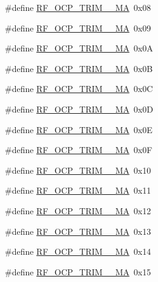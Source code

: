 \begin{DoxyCompactItemize}
\item 
\#define \hyperlink{sx1276Regs-Fsk_8h_a457a3f7221afb38da84a69a8745e53b6}{R\+F\+\_\+\+O\+C\+P\+\_\+\+T\+R\+I\+M\+\_\+\_\+\+MA}~0x08
\item 
\#define \hyperlink{sx1276Regs-Fsk_8h_aae9790e06b8eb78619b36ddac797362d}{R\+F\+\_\+\+O\+C\+P\+\_\+\+T\+R\+I\+M\+\_\+\_\+\+MA}~0x09
\item 
\#define \hyperlink{sx1276Regs-Fsk_8h_a26174898b5ac7efce60f4b347910b1ca}{R\+F\+\_\+\+O\+C\+P\+\_\+\+T\+R\+I\+M\+\_\+\_\+\+MA}~0x0A
\item 
\#define \hyperlink{sx1276Regs-Fsk_8h_a1387ca1b80a4984a2de36325743a6050}{R\+F\+\_\+\+O\+C\+P\+\_\+\+T\+R\+I\+M\+\_\+\_\+\+MA}~0x0B
\item 
\#define \hyperlink{sx1276Regs-Fsk_8h_a87c78055bb1ff7e9f72416324d1afa5f}{R\+F\+\_\+\+O\+C\+P\+\_\+\+T\+R\+I\+M\+\_\+\_\+\+MA}~0x0C
\item 
\#define \hyperlink{sx1276Regs-Fsk_8h_aec4e8936c74d0338b33f7c5201a13007}{R\+F\+\_\+\+O\+C\+P\+\_\+\+T\+R\+I\+M\+\_\+\_\+\+MA}~0x0D
\item 
\#define \hyperlink{sx1276Regs-Fsk_8h_ac48e4dd5062ac350432eadd140ba12fe}{R\+F\+\_\+\+O\+C\+P\+\_\+\+T\+R\+I\+M\+\_\+\_\+\+MA}~0x0E
\item 
\#define \hyperlink{sx1276Regs-Fsk_8h_abc2ff6a69d2a51ea5b724ca790af57bc}{R\+F\+\_\+\+O\+C\+P\+\_\+\+T\+R\+I\+M\+\_\+\_\+\+MA}~0x0F
\item 
\#define \hyperlink{sx1276Regs-Fsk_8h_a86b4c20cd2573e3fa003699d26e9dec5}{R\+F\+\_\+\+O\+C\+P\+\_\+\+T\+R\+I\+M\+\_\+\_\+\+MA}~0x10
\item 
\#define \hyperlink{sx1276Regs-Fsk_8h_ac7e461bc044a8ce5c11b3c944da839a0}{R\+F\+\_\+\+O\+C\+P\+\_\+\+T\+R\+I\+M\+\_\+\_\+\+MA}~0x11
\item 
\#define \hyperlink{sx1276Regs-Fsk_8h_a353421d2bcb86f0e10738e847ee7cc33}{R\+F\+\_\+\+O\+C\+P\+\_\+\+T\+R\+I\+M\+\_\+\_\+\+MA}~0x12
\item 
\#define \hyperlink{sx1276Regs-Fsk_8h_aff8239a2ad3878879cafc1766f7706df}{R\+F\+\_\+\+O\+C\+P\+\_\+\+T\+R\+I\+M\+\_\+\_\+\+MA}~0x13
\item 
\#define \hyperlink{sx1276Regs-Fsk_8h_a71ddc55ff41ffa8eed9f84918e12f8d2}{R\+F\+\_\+\+O\+C\+P\+\_\+\+T\+R\+I\+M\+\_\+\_\+\+MA}~0x14
\item 
\#define \hyperlink{sx1276Regs-Fsk_8h_a45b10e117bee9e321a4b5addb46a45f8}{R\+F\+\_\+\+O\+C\+P\+\_\+\+T\+R\+I\+M\+\_\+\_\+\+MA}~0x15
\item 

\end{DoxyCompactItemize}
